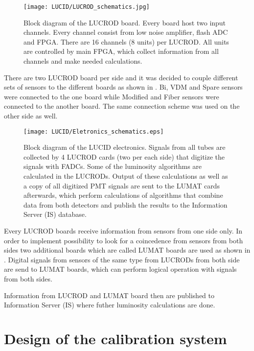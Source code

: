 \begin{figure}
\centering
\texttt{[image: LUCID/LUCROD\_schematics.jpg]}
\caption{Block diagram of the LUCROD board. Every board host two input channels. Every channel consist from low noise amplifier, flash ADC and FPGA. 
There are 16 channels (8 units) per LUCROD. All units are controlled by main FPGA, which collect information from all channels and make needed calculations.}
\label{fig:LUCROD_schematics}
\end{figure}

There are two LUCROD board per side and it was decided to couple different sets of sensors to the different boards as shown in .
Bi, VDM and Spare sensors were connected to the one board while Modified and Fiber sensors were connected to the another board.
The same connection scheme was used on the other side as well.

\begin{figure}
\centering
\texttt{[image: LUCID/Eletronics\_schematics.eps]}
\caption{Block diagram of the LUCID electronics. Signals from all tubes are collected by 4 \mbox{LUCROD} cards 
(two per 
each side) that digitize the signals with FADCs. Some of the luminosity algorithms are calculated in the LUCRODs. 
Output of these calculations as well as a copy of all digitized PMT 
signals are sent to the LUMAT cards afterwards, which perform calculations of algorithms that combine data from 
both detectors and publish the results to the Information Server (IS) database.}
\label{fig:Eletronics_schematics}
\end{figure}

Every LUCROD boards receive information from sensors from one side only.
In order to implement possibility to look for a coincedence from sensors from both sides two additional boards which are called LUMAT boards are used
as shown in .
Digital signals from sensors of the same type from LUCRODs from both side are send to LUMAT boards, which can perform logical operation with signals from both sides.

Information from LUCROD and LUMAT board then are published to Information Server (IS) where futher luminosity calculations are done.

\section{Design of the calibration system}

